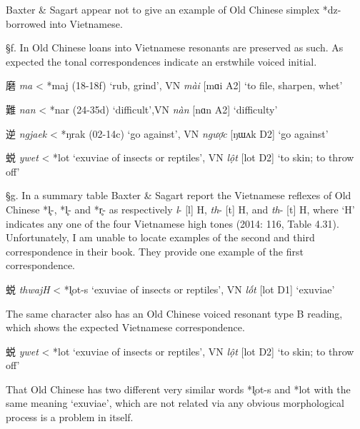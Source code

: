 Baxter \& Sagart appear not to give an example of Old Chinese simplex
*dz- borrowed into Vietnamese.

§f. In Old Chinese loans into Vietnamese resonants are preserved as
such. As expected the tonal correspondences indicate an erstwhile voiced
initial.

\begin{description} \item
磨  \emph{ma} \textless{} *m{}aj (18-18f) `rub, grind', VN \emph{mài}
{[}mɑi A2] `to file, sharpen, whet'

\item
難  \emph{nan} \textless{} *n{}ar (24-35d) `difficult',VN \emph{nàn}
{[}nɑn A2] `difficulty'

\item
逆  \emph{ngjaek} \textless{} *ŋrak (02-14c) `go against', VN
\emph{ngược} {[}ŋɯʌk D2] `go against'

\item
蜕  \emph{ywet} \textless{} *lot `exuviae of insects or reptiles', VN
\emph{lột} {[}lot D2] `to skin; to throw off'
\end{description}

§g. In a summary table Baxter \& Sagart report the Vietnamese reflexes
of Old Chinese *l̥{}-, *l̥- and *r̥- as respectively \emph{l}- {[}l] H,
\emph{th}- {[}t{}] H, and \emph{th}- {[}t{}] H, where `H' indicates
any one of the four Vietnamese high tones (2014: 116, Table 4.31).
Unfortunately, I am unable to locate examples of the second and third
correspondence in their book. They provide one example of the first
correspondence.

\begin{description} \item
蜕  \emph{thwajH} \textless{} *l̥{}ot-s `exuviae of insects or reptiles',
VN \emph{lốt} {[}lot D1] `exuviae'
\end{description}

The same character also has an Old Chinese voiced resonant type B
reading, which shows the expected Vietnamese correspondence.

\begin{description} \item
蜕  \emph{ywet} \textless{} *lot `exuviae of insects or reptiles', VN
\emph{lột} {[}lot D2] `to skin; to throw off'
\end{description}

That Old Chinese has two different very similar words *l̥{}ot-s and *lot
with the same meaning `exuviae', which are not related via any obvious
morphological process is a problem in itself.


